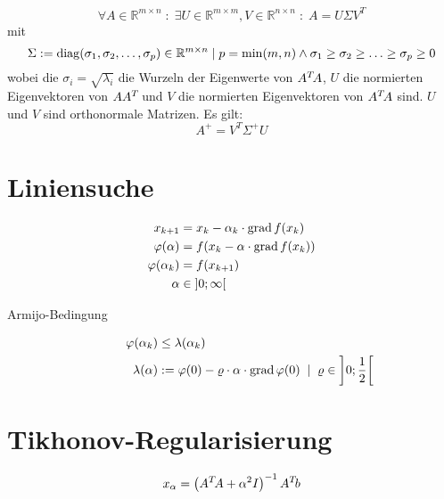 \[ \forall A\in\mathbb{R}^{m\times n} \; : \; \exists U\in\mathbb{R}^{m\times m}, V\in\mathbb{R}^{n\times n} \; : \; A=U\Sigma V^T \]
mit
\[ \Sigma:=\operatorname{diag}(\sigma_1,\sigma_2,\ldots,\sigma_p)\in\mathbb{R}^{m\times n}\mid p=\min(m,n)\land\sigma_1\geq\sigma_2\geq\ldots\geq\sigma_p\geq0 \]
wobei die $\sigma_{i}=\sqrt{\lambda_{i}}$ die Wurzeln der Eigenwerte von $A\T A$, $U$ die normierten Eigenvektoren von $AA\T$ und $V$ die normierten Eigenvektoren von $A\T A$ sind.
$U$ und $V$ sind orthonormale Matrizen.
Es gilt:
\[ A^+ = V^T \Sigma^+ U \]



\section{Liniensuche}

\begin{align*}
  x_{k+1}             & = x_k - \alpha_k\cdot\operatorname{grad} f(x_k)\\
  \varphi(\alpha)     & =f(x_k-\alpha\cdot\operatorname{grad} f(x_k))\\
  \varphi(\alpha_{k}) & =f(x_{k+1})\\
  \alpha              & \in\left]0;\infty\right[
\end{align*}

\begin{description}
  \item [{Armijo-Bedingung}]
	\begin{align*}
	  \varphi(\alpha_k) & \leq\lambda(\alpha_k)\\
	  \lambda(\alpha)   & :=\varphi(0)-\varrho\cdot\alpha\cdot\operatorname{grad} \varphi(0)\;\mid\;\varrho\in\left]0;\frac{1}{2}\right[
	\end{align*}
\end{description}

\section{Tikhonov-Regularisierung}

\[ x_{\alpha} = \left(A\T A+\alpha^2 I\right)^{-1}A\T b \]

